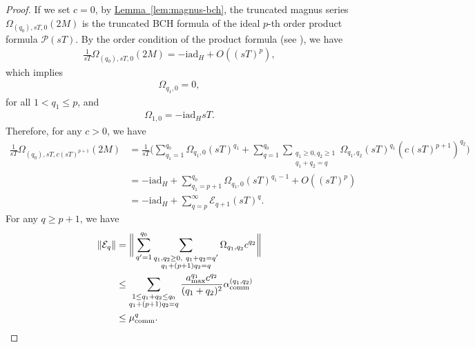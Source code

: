 \documentclass[11pt]{article}
\newcommand{\lem}[1]{\hyperref[lem:#1]{Lemma~\ref*{lem:#1}}}
\renewcommand{\i}{\mathrm{i}}
\renewcommand{\L}{\mathcal{L}}
\newcommand{\ad}{\mathrm{ad}}
\newcommand{\E}{\mathcal{E}}
\begin{document}
\begin{proof}
    If we set $c=0$, by \lem{magnus-bch}, the truncated magnus series $\Omega_{(q_0), sT,0}(2M)$ is the truncated BCH formula of the ideal $p$-th order product formula $\mathcal{P}(sT)$. By the order condition of the product formula (see \citet[Lemma 2]{watson2025exponentially}), we have \begin{align*}
        \frac{1}{sT}\Omega_{(q_0), sT,0}(2M) = -\i \ad_H + O((sT)^p),
    \end{align*}
    which implies \begin{align*}
        \Omega_{q_1, 0} = 0,
    \end{align*}
    for all $1 <q_1 \le p$, and \begin{align*}
        \Omega_{1,0} = - \i \ad_H sT.
    \end{align*} 
    Therefore, for any $c>0$, we have \begin{align*}
        \frac{1}{sT}\Omega_{(q_0), sT,c(sT)^{p+1}}(2M) &= \frac{1}{sT}\Big(\sum_{q_1=1}^{q_0}\Omega_{q_1, 0}(sT)^{q_1} + \sum_{q = 1}^{q_0}\sum_{\substack{q_1\ge 0,q_2\ge 1\\ q_1+q_2 = q}} \Omega_{q_1, q_2} (sT)^{q_1}(c(sT)^{p+1})^{q_2}\Big) \\
        & = -\i \ad_H + \sum_{q_1 = p+1}^{q_0} \Omega_{q_1, 0} (sT)^{q_1-1} + O((sT)^p) \\
        & = -\i \ad_H + \sum_{q = p}^{\infty} \E_{q+1} (sT)^{q}.
    \end{align*}
    For any $q\ge p+1$, we have \begin{align*}
        \|\E_{q}\| &= \bigg\|\sum_{q'=1}^{q_0}\sum_{\substack{q_1, q_2\ge 0,~ q_1+q_2=q' \\
        q_1+(p+1)q_2 = q}} \Omega_{q_1,q_2} c^{q_2} \bigg\|\\
        &\le \sum_{\substack{1\le q_1+ q_2\le q_0 \\
        q_1+(p+1)q_2 = q}}\frac{a_{\max}^{q_1}c^{q_2}}{(q_1+q_2)^2} \alpha_{\rm comm}^{(q_1, q_2)} \\
        &\le  \mu_{\rm comm}^q.
    \end{align*}
\end{proof}
\end{document}
